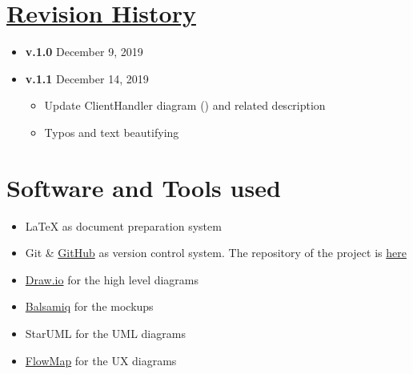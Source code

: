 \begin{appendices}
	\section[Revision History]{\hyperlink{toc}{Revision History}}
		\label{sec:revisionHistory}
		
		\begin{itemize}
			\item \textbf{v.1.0} December 9, 2019
			
			\item \textbf{v.1.1} December 14, 2019
				\begin{itemize}
					\item Update ClientHandler diagram () and related description
					
					\item Typos and text beautifying
				\end{itemize}
		\end{itemize}
		
	\section{Software and Tools used}
		\label{sec:softwareAndTools}
		
		\begin{itemize}
			\item \LaTeX{} as document preparation system
			\item Git \& \href{https://github.com/}{GitHub} as version control system. The repository of the project is \href{https://github.com/Megapiro/PaccianiPiro}{here}
			\item \href{https://www.draw.io/}{Draw.io} for the high level diagrams
			\item \href{https://balsamiq.com/}{Balsamiq} for the mockups
			\item StarUML for the UML diagrams
			\item \href{https://flowmapp.com/}{FlowMap} for the UX diagrams
		\end{itemize}		
\end{appendices}